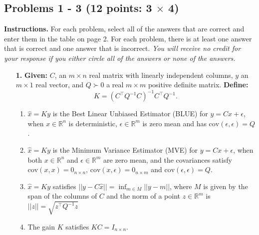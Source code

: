 \documentclass[letterpaper]{article}
\newcommand{\real}{\mathbb R}  %
\newcommand{\Covof}[2]{ \mathrm{cov} \left(#1,#2\right)}
\begin{document}
\subsection*{Problems 1 - 3 {\rm (12 points: 3 $\times$ 4)}}

{\bf Instructions.} For each problem, select all of the answers that are correct and enter them in the table on page 2. For each problem, there is at least one answer that is correct and one answer that is incorrect. \textit{You will receive no credit for your response if you either circle all of the answers or none of the answers.}

\vspace{0.5in}


\begin{enumerate}
\setlength{\itemsep}{2.5in}

\item[{\bf 1.}] \textbf{Given:} $C$, an $m \times n$ real matrix with linearly independent columns, $y$ an $m \times 1$ real vector, and  $Q\succ 0$ a real $m \times m$ positive definite matrix. \textbf{Define:}
    $$K=(C^\top Q^{-1} C)^{-1} C^\top Q^{-1} .$$
\begin{enumerate}
\setlength{\itemsep}{.15in}
\renewcommand{\labelenumi}{(\alph{enumi})}
\setlength{\itemsep}{.1in}
\item $\widehat{x}=Ky$ is the Best Linear Unbiased Estimator (BLUE) for $y=Cx + \epsilon$, when $x\in \real^n$ is deterministic, $\epsilon \in \real^m$ is zero mean and has $\Covof{\epsilon}{\epsilon}=Q$.
\item $\widehat{x}=Ky$ is the Minimum Variance Estimator (MVE) for $y=Cx + \epsilon$, when both $x\in \real^n$ and $\epsilon \in \real^m$ are zero mean, and the covariances satisfy $\Covof{x}{x}=0_{n\times n}$, $\Covof{x}{\epsilon}=0_{n\times m}$ and $\Covof{\epsilon}{\epsilon}= Q$.
    \item $\widehat{x}=Ky$ satisfies $||y-C\widehat{x}||=\inf_{m\in M} ||y-m||$, where $M$ is given by the span of the columns of $C$ and the norm of a point $z\in \real^m$ is $||z||=\sqrt{z^\top Q^{-1} z}$
\item The gain $K$ satisfies $KC=I_{n \times n}$.
\end{enumerate}

\end{enumerate}
\end{document}
